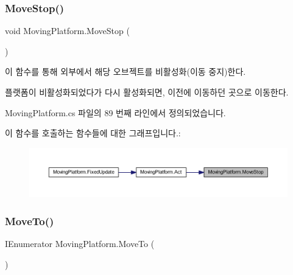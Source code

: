 \subsubsection{\texorpdfstring{MoveStop()}{MoveStop()}}
{\footnotesize\ttfamily void Moving\+Platform.\+Move\+Stop (\begin{DoxyParamCaption}{ }\end{DoxyParamCaption})}



이 함수를 통해 외부에서 해당 오브젝트를 비활성화(이동 중지)한다. 

플랫폼이 비활성화되었다가 다시 활성화되면, 이전에 이동하던 곳으로 이동한다. 

Moving\+Platform.\+cs 파일의 89 번째 라인에서 정의되었습니다.


\begin{DoxyCode}{0}

\end{DoxyCode}
이 함수를 호출하는 함수들에 대한 그래프입니다.\+:\nopagebreak
\begin{figure}[H]
\begin{center}
\leavevmode
\includegraphics[width=350pt]{df/d42/class_moving_platform_a9150bceccb63034907ab3ec46216ae83_icgraph}
\end{center}
\end{figure}
\mbox{\label{class_moving_platform_afb52616391e79cf7e015f5fb37d50e16}} 
\subsubsection{\texorpdfstring{MoveTo()}{MoveTo()}}
{\footnotesize\ttfamily I\+Enumerator Moving\+Platform.\+Move\+To (\begin{DoxyParamCaption}{ }\end{DoxyParamCaption})\hspace{0.3cm}{\ttfamily [private]}}



